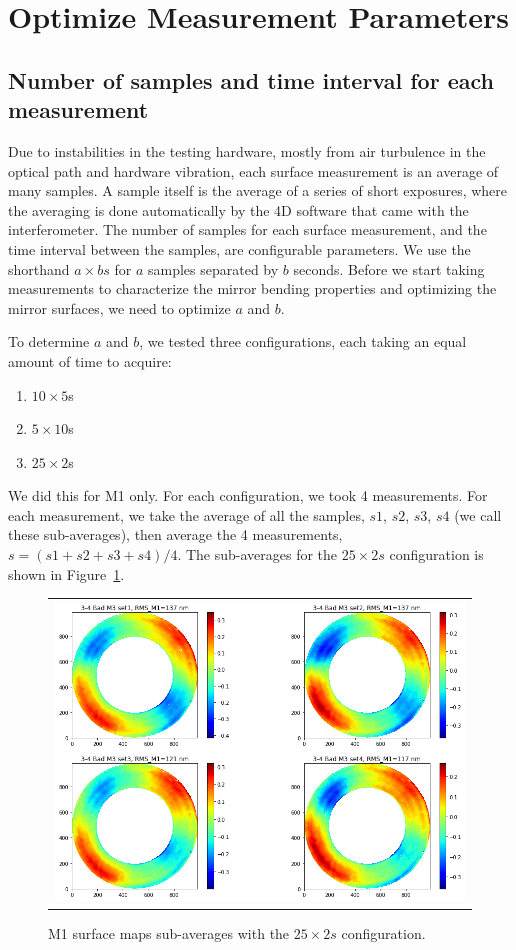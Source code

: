 \documentclass [twoside,openbib,12pt]{article}
\newcommand{\bnum}{\begin{enumerate}}
\newcommand{\enum}{\end{enumerate}}
\begin{document}
\section{Optimize Measurement Parameters}
\label{sec:ab}

\subsection{Number of samples and time interval for each measurement}

Due to instabilities in the testing hardware, mostly from air
turbulence in the optical path and hardware vibration,
each surface measurement is an average
of many samples. A sample itself is the average of a series of short
exposures, where the averaging is done automatically by the 4D
software that came with the interferometer. The number of samples for
each surface measurement, and the time interval between the samples,
are configurable parameters.
We use the shorthand $a\times bs$ for $a$ samples separated by $b$ seconds.
Before we start taking measurements to characterize the mirror bending
properties and optimizing the mirror surfaces, we need to optimize $a$
and $b$.

To determine $a$ and $b$, we tested three configurations, each taking
an equal amount of time to acquire:
\bnum
\item $10 \times 5$s
\item $5 \times 10$s
\item $25 \times 2$s
\enum
We did this for M1 only. For each configuration, we took 4
measurements.
For each measurement, we take the average of all the samples, $s1$,
$s2$, $s3$, $s4$ (we call these sub-averages), then average the 4 measurements, $s =
(s1+s2+s3+s4)/4$.
The sub-averages for the $25 \times 2s$ configuration is
shown in Figure~\ref{fig:ab}.

  \begin{figure}[bthp]
   \begin{center}
   \begin{tabular}{c}
\includegraphics[width=150mm]{figures/ab25x2.png}
  \end{tabular}
   \end{center}
   \caption
  { \label{fig:ab}
M1 surface maps sub-averages with the $25 \times 2s$ configuration.
 }
\end{figure}
\end{document}
